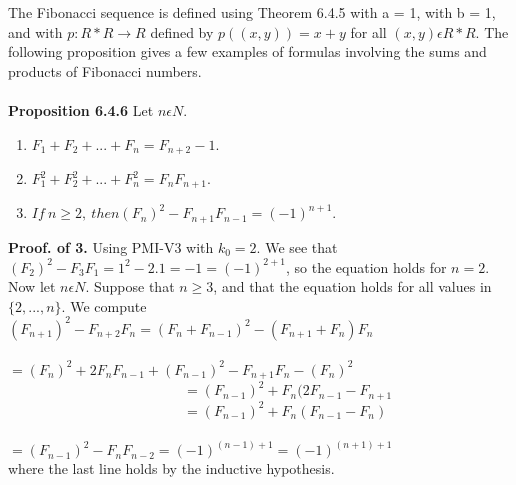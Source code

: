 \documentclass[a4paper,10pt]{report}
\begin{document}
The Fibonacci sequence is defined using Theorem 6.4.5 with a = 1, with b = 1, and with $p:R*R\rightarrow R$ defined by $p((x,y))=x+y$ for all $(x,y)\epsilon R*R$. The following proposition gives a few examples of formulas involving the sums and products of Fibonacci numbers.
\\ \\ 
{\bf Proposition 6.4.6} Let $n\epsilon N$.
\begin{enumerate}
\item $F_1 + F_2 + . . . + F_n = F_{n+2} − 1$.
\item $F_1^2 + F_2^2 + . . . + F_n^2 = F_nF_{n+1}$.
\item $ If~ n\geq2,~ then (F_n)^2 − F_{n+1}F_{n−1}=(−1)^{n+1}$.
\end{enumerate}
{\bf Proof. of 3.} Using PMI-V3 with $k_0=2$. We see that $(F_2)^2-F_3F_1=1^2-2.1=-1=(-1)^{2+1}$, so the equation holds for $n=2$. Now let $n\epsilon N$. Suppose that $n\geq3$, and that the equation holds for all values in $\{2, . . ., n\}$. We compute \\
$(F_{n+1})^2 - F_{n+2}F_n=(F_n+F_{n-1})^2 - (F_{n+1}+F_n)F_n$\\
~~~~~~~~~~~~~~~~~~~~~~~~~$=(F_n)^2+2F_nF_{n-1}+(F_{n-1})^2-F_{n+1}F_n-(F_n)^2$\\
~~~~~~~~~~~~~~~~~~~~~~~~~$=(F_{n-1})^2+F_n(2F_{n-1}-F_{n+1}$\\
~~~~~~~~~~~~~~~~~~~~~~~~~$=(F_{n-1})^2+F_n(F_{n-1}-F_n)$\\
~~~~~~~~~~~~~~~~~~~~~~~~~$=(F_{n-1})^2-F_nF_{n-2}=(-1)^{(n-1)+1}=(-1)^{(n+1)+1}$ \\where the last line holds by the inductive hypothesis.
\end{document}

